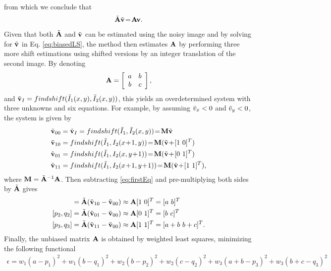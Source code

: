  from which we conclude that 
 \begin{equation}
 \tilde{\mathbf{A}}\tilde{\mathbf{v}}\!=\!\mathbf{A}\mathbf{v}.
\label{eq:linearDep2}
 \end{equation}
Given that both $\tilde{\mathbf{A}}$ and $\tilde{\mathbf{v}}$ can be estimated using the noisy image and by solving for $\tilde{\mathbf{v}}$ in Eq. \eqref{eq:biasedLS}, the method then estimates $\mathbf{A}$ by performing three more shift estimations using shifted versions by an integer translation of the second image. By denoting 
\begin{equation}
\mathbf{A} = \left[ \begin{array}{c c}a & b\\ b & c\end{array}\right],
\end{equation}
and $\tilde{\mathbf{v}}_I = findshift(\tilde{I}_1(x,y), \tilde{I}_2(x,y))$, this yields an overdetermined system with three unknowns and six equations. For example, by assuming $\tilde{v}_x < 0$ and $\tilde{v}_y < 0$, the system is given by
\begin{align}
\label{eq:firstEq} \nbv_{00} &= \nbv_I = findshift(\nI_1, \nI_2(x,y))\!=\!\bM\nbv\\ 
\nonumber \nbv_{10} &= findshift(\nI_1, I_2(x\!+\!1,y))\!=\!\bM(\nbv\!+\![1 \ 0]^T)\\
\nonumber \nbv_{01} &= findshift(\nI_1, I_2(x,y\!+\!1))\!=\!\bM(\nbv\!+\![0 \ 1]^T)\\
\nbv_{11} &= findshift(\nI_1, I_2(x\!+\!1,y\!+\!1))\!=\!\bM(\nbv\!+\![1 \ 1]^T),
\label{eq:shiftEstimates00}
\end{align}
where $\mathbf{M}=\tilde{\mathbf{A}}^{-1}\mathbf{A}$. Then subtracting \eqref{eq:firstEq} and pre-multiplying both sides by $\tilde{\mathbf{A}}$ gives
\begin{align}
[p_1, q_1] = \nbA(\nbv_{10} - \nbv_{00}) &\approx \bA[1 \ 0]^T = [a\  b]^T\\
[p_2, q_2] = \nbA(\nbv_{01} - \nbv_{00}) &\approx \bA[0 \ 1]^T = [b\  c]^T\\
[p_3, q_3] = \nbA(\nbv_{11} - \nbv_{00}) &\approx \bA[1 \ 1]^T = [a+b\  b+c]^T.
\end{align}
Finally, the unbiased matrix $\mathbf{A}$ is obtained by weighted least squares, minimizing the following functional
\begin{align}
\epsilon = w_1(a - p_1)^2 + w_1(b-q_1)^2 +w_2(b - p_2)^2 + 
w_2(c-q_2)^2 + w_3(a+b - p_3)^2 + w_3(b+c-q_3)^2
\label{eq:functional00}
\end{align}
